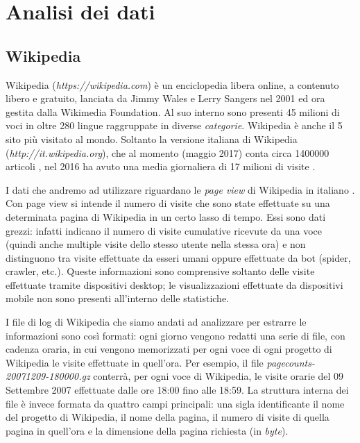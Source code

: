 \chapter{Analisi dei dati}
\bigskip

\section{Wikipedia}
\bigskip
Wikipedia (\textit{https://wikipedia.com}) è un enciclopedia libera online, a contenuto libero e gratuito, lanciata da Jimmy 
Wales e Lerry Sangers nel 2001 ed ora gestita dalla Wikimedia Foundation. Al suo interno sono presenti 45 milioni di voci in 
oltre 280 lingue raggruppate in diverse \textit{categorie}. Wikipedia è anche il 5 sito più visitato al mondo. Soltanto la 
versione italiana di Wikipedia (\textit{http://it.wikipedia.org}), che al momento (maggio 2017) conta circa 1400000 articoli 
\cite{wikipedia_stats}, nel 2016 ha avuto una media giornaliera di 17 milioni di visite \cite{it_wikipedia_views_2016}.
\bigskip

I dati che andremo ad utilizzare riguardano le \textit{page view} di Wikipedia in italiano \cite{wikipedia_pageviews}. Con 
page view si intende il numero di visite che sono state effettuate su una determinata pagina di Wikipedia in un certo lasso 
di tempo. Essi sono dati grezzi: infatti indicano il numero di visite cumulative ricevute da una voce (quindi anche multiple 
visite dello stesso utente nella stessa ora) e non distinguono tra visite effettuate da esseri umani oppure effettuate da bot 
(spider, crawler, etc.). Queste informazioni sono comprensive soltanto delle visite effettuate tramite dispositivi desktop; 
le visualizzazioni effettuate da dispositivi mobile non sono presenti all'interno delle statistiche.
\bigskip

I file di log di Wikipedia che siamo andati ad analizzare per estrarre le informazioni sono così formati: ogni giorno vengono 
redatti una serie di file, con cadenza oraria, in cui vengono memorizzati per ogni voce di ogni progetto di Wikipedia le 
visite effettuate in quell'ora. Per esempio, il file \textit{pagecounts-20071209-180000.gz} conterrà, per ogni voce di 
Wikipedia, le visite orarie del 09 Settembre 2007 effettuate dalle ore 18:00 fino alle 18:59. La struttura interna dei file è 
invece formata da quattro campi principali: una sigla identificante il nome del progetto di Wikipedia, il nome della pagina, 
il numero di visite di quella pagina in quell'ora e la dimensione della pagina richiesta (in \textit{byte}).
\bigskip 
  

